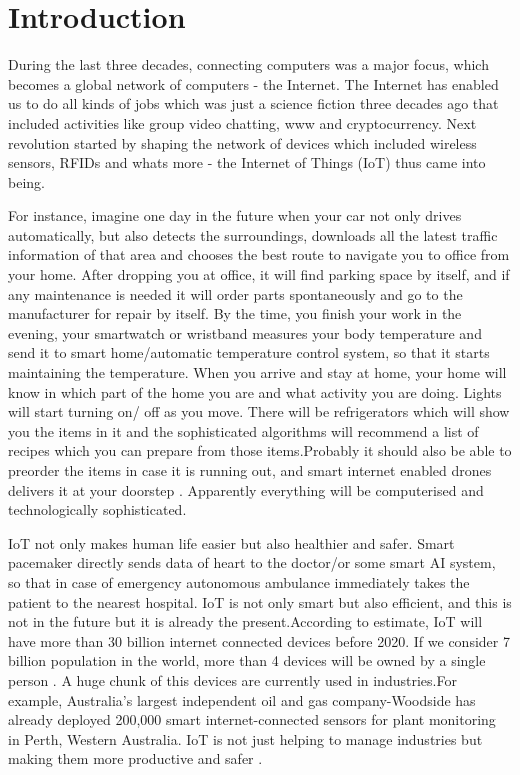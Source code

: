 \documentclass[preprint,10pt,5p]{elsarticle}
\begin{document}

\section{Introduction}
\noindent During the last three decades, connecting computers was a major focus, which becomes a global network of computers - the Internet. The Internet has enabled us to do all kinds of jobs which was just a science fiction three decades ago that included activities like group video chatting, www and cryptocurrency. Next revolution started by shaping the network of devices which included wireless sensors, RFIDs and whats more - the Internet of Things (IoT) thus came into being. 

For instance, imagine one day in the future when your car not only drives automatically, but also detects the surroundings, downloads all the latest traffic information of that area and chooses the best route to navigate you to office from your home. After dropping you at office, it will find parking space by itself, and if any maintenance is needed it will order parts spontaneously and go to the manufacturer for repair by itself.\cite{gerla2014internet} By the time, you finish your work in the evening, your smartwatch or wristband measures your body temperature and send it to smart home/automatic temperature control system, so that it starts maintaining the temperature. When you arrive and stay at home, your home will know in which part of the home you are and what activity you are doing. Lights will start turning on/ off as you move\cite{han2010smart}. There will be refrigerators which will show you the items in it and the  sophisticated algorithms will recommend a list of recipes which you can prepare from those items.Probably it should also be able to preorder the items in case it is running out, and smart internet enabled drones delivers it at your doorstep \cite{helal2005gator} \cite{zhou2014unmanned}. Apparently everything will be computerised and technologically sophisticated.

IoT not only makes human life easier but also healthier and safer. Smart pacemaker directly sends data of heart to the doctor/or some smart AI system, so that in case of emergency autonomous ambulance immediately takes the patient to the nearest hospital\cite{hernandez2001real}. IoT is not only smart but also efficient, and this is not in the future but it is already the present.According to estimate, IoT will have more than 30 billion internet connected devices before 2020. If we consider 7 billion population in the world, more than 4 devices will be owned by a single person \cite{atzori2010internet}. A huge chunk of this devices are currently used in industries.For example, Australia's largest independent oil and gas company-Woodside has already deployed 200,000 smart internet-connected sensors for plant monitoring in Perth, Western Australia. IoT is not just helping to manage industries but making them more productive and safer \cite{Bloede2015}.
\end{document}
